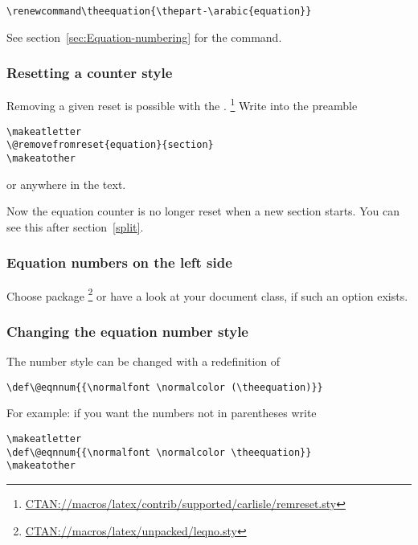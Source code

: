 \begin{lstlisting}
\renewcommand\theequation{\thepart-\arabic{equation}}
\end{lstlisting}

See section~\vref{sec:Equation-numbering} for the \AmSmath command.


\subsubsection{Resetting a counter style}

Removing a given reset is possible with the .%
\footnote{\href{http://www.ctan.org/tex-archive/macros/latex/contrib/supported/carlisle/remreset.sty}{CTAN://macros/latex/contrib/supported/carlisle/remreset.sty}} Write into the %
 preamble

\begin{lstlisting}
\makeatletter
\@removefromreset{equation}{section}
\makeatother
\end{lstlisting}
or anywhere in the text.

Now the equation counter is no longer reset when a new section starts.
You can see this after section~\vref{split}.


\subsubsection{Equation numbers on the left side}

Choose package %
\footnote{\href{http://www.ctan.org/tex-archive/macros/latex/unpacked/leqno.sty}{CTAN://macros/latex/unpacked/leqno.sty}}
or have a look at your document class, if such an option exists.

\subsubsection{Changing the equation number style}
The number style can be changed with a redefinition of

\begin{verbatim}
\def\@eqnnum{{\normalfont \normalcolor (\theequation)}}
\end{verbatim}

For example: if you want the numbers not in parentheses write

\begin{lstlisting}
\makeatletter
\def\@eqnnum{{\normalfont \normalcolor \theequation}}
\makeatother
\end{lstlisting}

